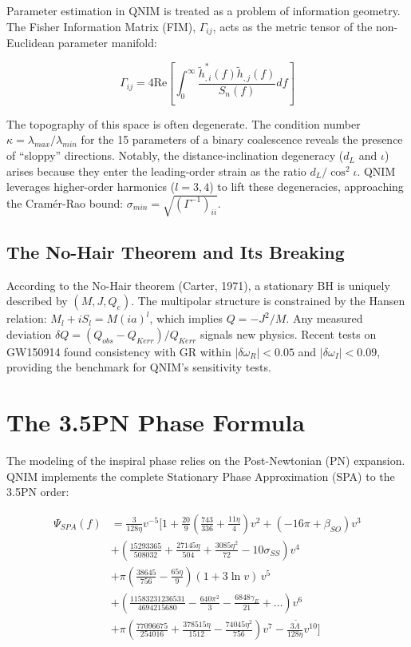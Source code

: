 \documentclass[11pt,a4paper,spanish]{book}
\numberwithin{equation}{chapter}
\numberwithin{figure}{chapter}
\numberwithin{equation}{chapter}
\numberwithin{figure}{chapter}
\numberwithin{table}{chapter}
\begin{document}
Parameter estimation in QNIM is treated as a problem of information geometry. The Fisher Information Matrix (FIM), $\Gamma_{ij}$, acts as the metric tensor of the non-Euclidean parameter manifold:

\begin{equation}
\Gamma_{ij} = 4 \text{Re} \left[ \int_0^\infty \frac{\tilde{h}^*_{,i}(f) \tilde{h}_{,j}(f)}{S_n(f)} df \right]
\end{equation}

The topography of this space is often degenerate. The condition number $\kappa = \lambda_{max}/\lambda_{min}$ for the 15 parameters of a binary coalescence reveals the presence of ``sloppy'' directions. Notably, the distance-inclination degeneracy ($d_L$ and $\iota$) arises because they enter the leading-order strain as the ratio $d_L/\cos^2\iota$. QNIM leverages higher-order harmonics ($l=3,4$) to lift these degeneracies, approaching the Cramér-Rao bound: $\sigma_{min} = \sqrt{(\Gamma^{-1})_{ii}}$.

\subsection{The No-Hair Theorem and Its Breaking}

According to the No-Hair theorem (Carter, 1971), a stationary BH is uniquely described by $(M, J, Q_e)$. The multipolar structure is constrained by the Hansen relation: $M_l + iS_l = M(ia)^l$, which implies $Q = -J^2/M$. Any measured deviation $\delta Q = (Q_{obs} - Q_{Kerr}) / Q_{Kerr}$ signals new physics. Recent tests on GW150914 found consistency with GR within $|\delta\omega_R| < 0.05$ and $|\delta\omega_I| < 0.09$, providing the benchmark for QNIM's sensitivity tests.

\section{The 3.5PN Phase Formula}

The modeling of the inspiral phase relies on the Post-Newtonian (PN) expansion. QNIM implements the complete Stationary Phase Approximation (SPA) to the 3.5PN order:

\begin{align}
\Psi_{SPA}(f) &= \frac{3}{128\eta} v^{-5}
  \Bigg[ 1 + \frac{20}{9}\left(\frac{743}{336} + \frac{11\eta}{4}\right)v^2
  + (-16\pi + \beta_{SO}) v^3 \nonumber\\
  &+ \left(\frac{15293365}{508032} + \frac{27145\eta}{504}
     + \frac{3085\eta^2}{72} - 10\sigma_{SS}\right) v^4 \nonumber\\
  &+ \pi\!\left(\frac{38645}{756} - \frac{65\eta}{9}\right)(1+3\ln v)\,v^5 \nonumber\\
  &+ \left(\frac{11583231236531}{4694215680} - \frac{640\pi^2}{3}
     - \frac{6848\gamma_E}{21} + \ldots\right) v^6 \nonumber\\
  &+ \pi\!\left(\frac{77096675}{254016} + \frac{378515\eta}{1512}
     - \frac{74045\eta^2}{756}\right) v^7
  - \frac{3\tilde\Lambda}{128\eta} v^{10}
  \Bigg]
\end{align}
\end{document}
